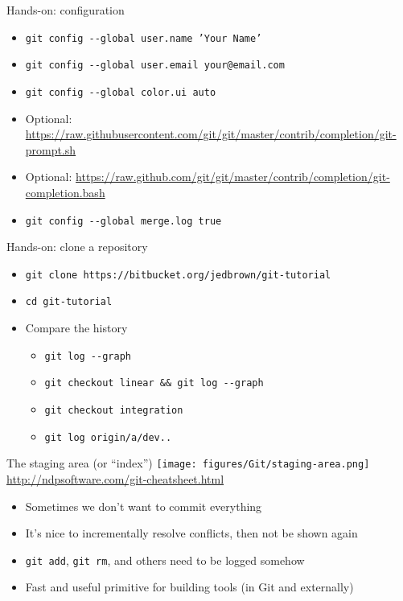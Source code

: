 \documentclass{beamer}
\begin{document}
\begin{frame}{Hands-on: configuration}
  \begin{itemize}
  \item \texttt{git config -{}-global user.name 'Your Name'}
  \item \texttt{git config -{}-global user.email your@email.com}
  \item \texttt{git config -{}-global color.ui auto}
  \item Optional: \url{https://raw.githubusercontent.com/git/git/master/contrib/completion/git-prompt.sh}
  \item Optional: \url{https://raw.github.com/git/git/master/contrib/completion/git-completion.bash}
  \item \texttt{git config -{}-global merge.log true}
  \end{itemize}
\end{frame}

\begin{frame}{Hands-on: clone a repository}
  \begin{itemize}
  \item \texttt{git clone https://bitbucket.org/jedbrown/git-tutorial}
  \item \texttt{cd git-tutorial}
  \item Compare the history
    \begin{itemize}
    \item \texttt{git log -{}-graph}
    \item \texttt{git checkout linear \&\& git log -{}-graph}
    \item \texttt{git checkout integration}
    \item \texttt{git log origin/a/dev..}
    \end{itemize}
  \end{itemize}
\end{frame}

\begin{frame}{The staging area (or ``index'')}
  \texttt{[image: figures/Git/staging-area.png]} \\
  {\tiny \url{http://ndpsoftware.com/git-cheatsheet.html}}
  \begin{itemize}
  \item Sometimes we don't want to commit everything
  \item It's nice to incrementally resolve conflicts, then not be shown again
  \item \texttt{git add}, \texttt{git rm}, and others need to be logged somehow
  \item Fast and useful primitive for building tools (in Git and externally)
  \end{itemize}
\end{frame}
\end{document}
